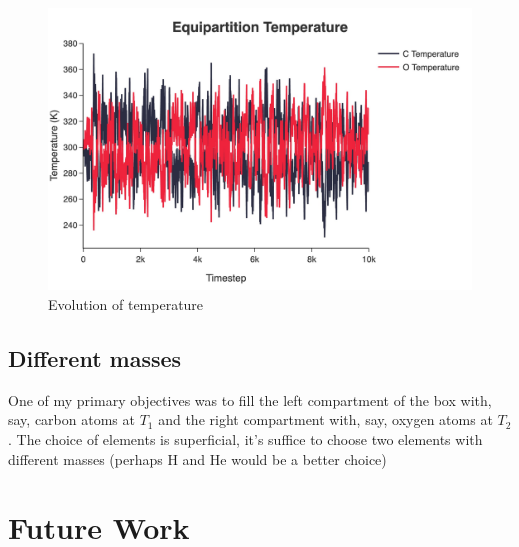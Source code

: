 \documentclass[12pt]{article}
\begin{document}
\begin{figure}[h]
    \centering
    \includegraphics[width=0.8\linewidth]{../figures/jpg/n200_m1_10k/equipartition_temperature.jpg}
    \caption{Evolution of temperature}
    \label{fig:temperature}
\end{figure}

\subsection{Different masses}
One of my primary objectives was to fill the left compartment of the box with, say, carbon atoms at $T_1$ and the right compartment with, say, oxygen atoms at $T_2$. The choice of elements is superficial, it's suffice to choose two elements with different masses (perhaps H and He would be a better choice)

\section{Future Work}
\end{document}
